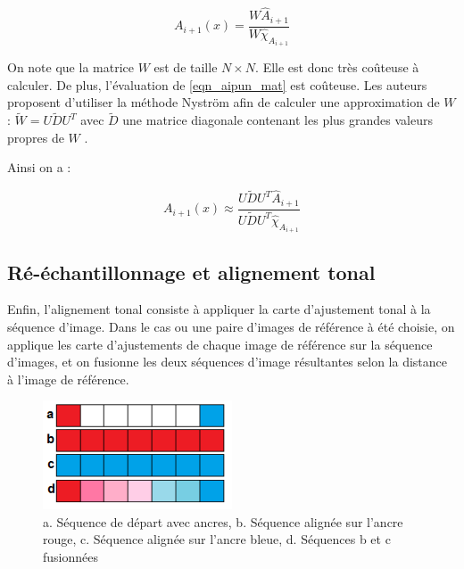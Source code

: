 \begin{equation}
A_{i+1}(x) = \frac{W\hat{A}_{i+1}}{W\hat{\chi}_{A_{i+1}}}
\label{eqn_aipun_mat}
\end{equation}

On note que la matrice $W$ est de taille $N\times N$. Elle est donc très coûteuse à calculer. De plus, l'évaluation de \ref{eqn_aipun_mat} est coûteuse. Les auteurs proposent d'utiliser la méthode Nyström \cite{fowlkes2004spectral} afin de calculer une approximation de $W$ : $\tilde{W} = U\tilde{D}U^{T}$ avec $\tilde{D}$ une matrice diagonale contenant les plus grandes valeurs propres de $W$ .

Ainsi on a : 

\begin{equation}
A_{i+1}(x) \approx \frac{U\tilde{D}U^{T}\hat{A}_{i+1}}{U\tilde{D}U^{T}\hat{\chi}_{A_{i+1}}}
\end{equation} 

\subsection{Ré-échantillonnage et alignement tonal}
Enfin, l'alignement tonal consiste à appliquer la carte d'ajustement tonal à la séquence d'image. Dans le cas ou une paire d'images de référence à été choisie, on applique les carte d'ajustements de chaque image de référence sur la séquence d'images, et on fusionne les deux séquences d'image résultantes selon la distance à l'image de référence.


\begin{figure}[h]
\centering
\includegraphics[width=0.5\textwidth]{Chapters/Images/alignement}
\caption{a. Séquence de départ avec ancres, b. Séquence alignée sur l'ancre rouge, c. Séquence alignée sur l'ancre bleue, d. Séquences b et c fusionnées}
\end{figure}